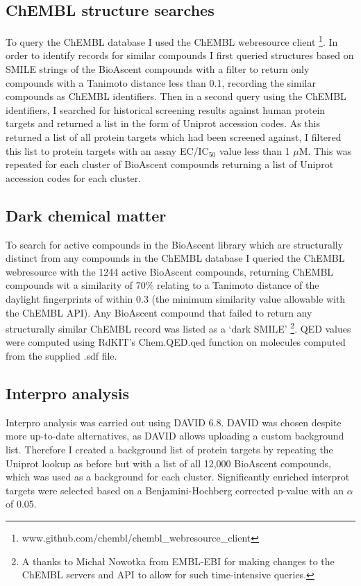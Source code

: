\documentclass[a4paper,11pt,twoside,openright]{scrbook}
\begin{document}
\subsection{ChEMBL structure searches}
To query the ChEMBL database I used the ChEMBL webresource client \footnote{www.github.com/chembl/chembl\_webresource\_client}.
In order to identify records for similar compounds I first queried structures based on SMILE strings of the BioAscent compounds with a filter to return only compounds with a Tanimoto distance less than 0.1, recording the similar compounds as ChEMBL identifiers.
Then in a second query using the ChEMBL identifiers, I searched for historical screening results against human protein targets and returned a list in the form of Uniprot accession codes.
As this returned a list of all protein targets which had been screened against, I filtered this list to protein targets with an assay EC/IC$_{50}$ value less than 1 $\mu$M.
This was repeated for each cluster of BioAscent compounds returning a list of Uniprot accession codes for each cluster.


\subsection{Dark chemical matter}
To search for active compounds in the BioAscent library which are structurally distinct from any compounds in the ChEMBL database I queried the ChEMBL webresource with the 1244 active BioAscent compounds, returning ChEMBL compounds wit a similarity of 70\% relating to a Tanimoto distance of the daylight fingerprints of within 0.3 (the minimum similarity value allowable with the ChEMBL API).
Any BioAscent compound that failed to return any structurally similar ChEMBL record was listed as a `dark SMILE'
\footnote{A thanks to Michał Nowotka from EMBL-EBI for making changes to the ChEMBL servers and API to allow for such time-intensive queries.}.
QED values were computed using RdKIT's Chem.QED.qed function on molecules computed from the supplied .sdf file.

\subsection{Interpro analysis}
Interpro analysis was carried out using DAVID 6.8. \cite{Huang2009}
DAVID was chosen despite more up-to-date alternatives, as DAVID allows uploading a custom background list.
Therefore I created a background list of protein targets by repeating the Uniprot lookup as before but with a list of all 12,000 BioAscent compounds, which was used as a background for each cluster.
Significantly enriched interprot targets were selected based on a Benjamini-Hochberg corrected p-value with an $\alpha$ of 0.05.



\end{document}
